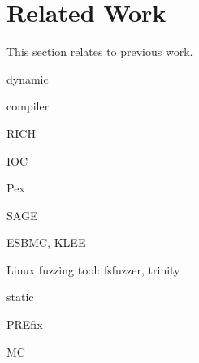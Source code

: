 \section{Related Work}
\label{s:relwk}

This section relates \sys to previous work.

dynamic

compiler

RICH~\cite{brumley:rich}

IOC

Pex

SAGE

ESBMC, KLEE

Linux fuzzing tool: fsfuzzer, trinity

static

PREfix~\cite{moy:prefix}

MC
